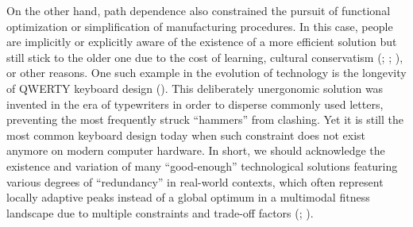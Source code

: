 \documentclass[
  11pt,
  letterpaper,
  DIV=11,
  numbers=noendperiod]{scrartcl}
\begin{document}
On the other hand, path dependence also constrained the pursuit of
functional optimization or simplification of manufacturing procedures.
In this case, people are implicitly or explicitly aware of the existence
of a more efficient solution but still stick to the older one due to the
cost of learning, cultural conservatism
(;
;
), or other reasons. One such
example in the evolution of technology is the longevity of QWERTY
keyboard design (). This
deliberately unergonomic solution was invented in the era of typewriters
in order to disperse commonly used letters, preventing the most
frequently struck ``hammers'' from clashing. Yet it is still the most
common keyboard design today when such constraint does not exist anymore
on modern computer hardware. In short, we should acknowledge the
existence and variation of many ``good-enough'' technological solutions
featuring various degrees of ``redundancy'' in real-world contexts,
which often represent locally adaptive peaks instead of a global optimum
in a multimodal fitness landscape due to multiple constraints and
trade-off factors (; ).
\end{document}
